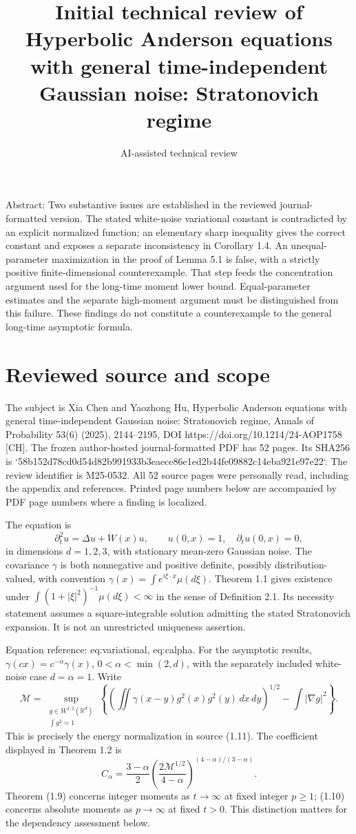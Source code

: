 \documentclass[10pt]{article}
\title{Initial technical review of
Hyperbolic Anderson equations with general
time-independent Gaussian noise: Stratonovich regime}
\author{AI-assisted technical review}
\date{}
\begin{document}
\maketitle
Abstract: Two substantive issues are established in the reviewed journal-formatted version. The stated white-noise variational constant is contradicted by an explicit normalized function; an elementary sharp inequality gives the correct constant and exposes a separate inconsistency in Corollary 1.4. An unequal-parameter maximization in the proof of Lemma 5.1 is false, with a strictly positive finite-dimensional counterexample. That step feeds the concentration argument used for the long-time moment lower bound. Equal-parameter estimates and the separate high-moment argument must be distinguished from this failure. These findings do not constitute a counterexample to the general long-time asymptotic formula.\par
\section*{Reviewed source and scope}
The subject is Xia Chen and Yaozhong Hu, Hyperbolic Anderson equations with general time-independent Gaussian noise: Stratonovich regime, Annals of Probability 53(6) (2025), 2144–2195, DOI https://doi.org/10.1214/24-AOP1758 [CH]. The frozen author-hosted journal-formatted PDF has 52 pages. Its SHA256 is `58b152d78cd0d54d82b991933b3eaece86e1ed2b44fe09882c14eba921e97e22`. The review identifier is M25-0532. All 52 source pages were personally read, including the appendix and references. Printed page numbers below are accompanied by PDF page numbers where a finding is localized.\par
The equation is \[\partial_t^2u=\Delta u+\dot W(x)u,\qquad u(0,x)=1,\quad
 \partial_tu(0,x)=0,\] in dimensions \(d=1,2,3\), with stationary mean-zero Gaussian noise. The covariance \(\gamma\) is both nonnegative and positive definite, possibly distribution-valued, with convention \(\gamma(x)=\int e^{i\xi\cdot x}\mu(d\xi)\). Theorem 1.1 gives existence under \(\int(1+|\xi|^2)^{-1}\mu(d\xi)<\infty\) in the sense of Definition 2.1. Its necessity statement assumes a square-integrable solution admitting the stated Stratonovich expansion. It is not an unrestricted uniqueness assertion.\par
Equation reference: eq:variational, eq:calpha. For the asymptotic results, \(\gamma(cx)=c^{-\alpha}\gamma(x)\), \(0<\alpha<\min(2,d)\), with the separately included white-noise case \(d=\alpha=1\). Write \[
 \mathcal M=\sup_{\substack{g\in W^{1,2}(\mathbb R^d)\\ \int g^2=1}}
 \left\{\left(\iint\gamma(x-y)g^2(x)g^2(y)\,dx\,dy\right)^{1/2}
       -\int|\nabla g|^2\right\}.\] This is precisely the energy normalization in source (1.11). The coefficient displayed in Theorem 1.2 is \[
 C_\alpha=\frac{3-\alpha}{2}
       \left(\frac{2\mathcal M^{1/2}}{4-\alpha}\right)^{(4-\alpha)/(3-\alpha)}.\] Theorem (1.9) concerns integer moments as \(t\to\infty\) at fixed integer \(p\ge1\); (1.10) concerns absolute moments as \(p\to\infty\) at fixed \(t>0\). This distinction matters for the dependency assessment below.\par
\end{document}
